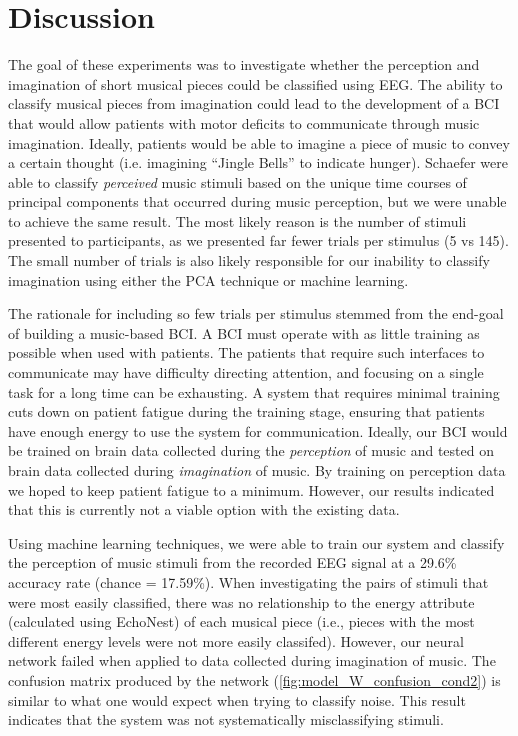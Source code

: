 \chapter{Discussion}
The goal of these experiments was to investigate whether the perception and imagination of short musical pieces could be classified using EEG.  
The ability to classify musical pieces from imagination could lead to the development of a \ac{BCI} that would allow patients with motor deficits to communicate through music imagination.
Ideally, patients would be able to imagine a piece of music to convey a certain thought (i.e. imagining ``Jingle Bells'' to indicate hunger).
Schaefer \etal \citeyear{schaefer_name_2011} were able to classify \emph{perceived} music stimuli based on the unique time courses of principal components that occurred during music perception, but we were unable to achieve the same result. 
The most likely reason is the number of stimuli presented to participants, as we presented far fewer trials per stimulus (5 vs 145). 
The small number of trials is also likely responsible for our inability to classify imagination using either the PCA technique or machine learning. 

The rationale for including so few trials per stimulus stemmed from the end-goal of building a music-based \ac{BCI}. 
A \ac{BCI} must operate with as little training as possible when used with patients.
The patients that require such interfaces to communicate may have difficulty directing attention, and focusing on a single task for a long time can be exhausting. 
A system that requires minimal training cuts down on patient fatigue during the training stage, ensuring that patients have enough energy to use the system for communication. 
Ideally, our \ac{BCI} would be trained on brain data collected during the \emph{perception} of music and tested on brain data collected during \emph{imagination} of music. 
By training on perception data we hoped to keep patient fatigue to a minimum. 
However, our results indicated that this is currently not a viable option with the existing data.  

Using machine learning techniques, we were able to train our system and classify the perception of music stimuli from the recorded EEG signal at a 29.6\% accuracy rate (chance = 17.59\%).
When investigating the pairs of stimuli that were most easily classified, there was no relationship to the energy attribute (calculated using EchoNest) of each musical piece (i.e., pieces with the most different energy levels were not more easily classifed). 
However, our neural network failed when applied to data collected during imagination of music.
The confusion matrix produced by the network (\autoref{fig:model_W_confusion_cond2}) is similar to what one would expect when trying to classify noise.
This result indicates that the system was not systematically misclassifying stimuli.

